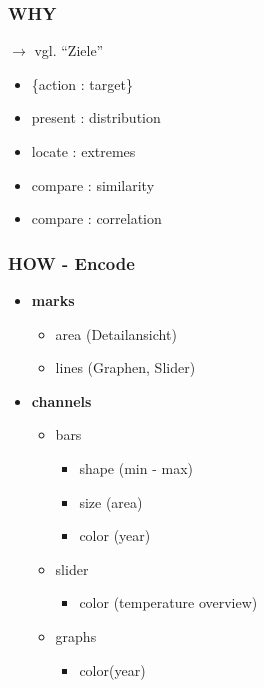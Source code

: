 \documentclass{beamer}
\begin{document}
  \begin{frame}
  \frametitle{WHY}
  $\rightarrow$ vgl. ``Ziele''
    \begin{itemize}
      \item \{action : target\}
      \item present : distribution
      \item locate : extremes
      \item compare : similarity
      \item compare : correlation
    \end{itemize}
  \end{frame}
  
  \begin{frame}
  \frametitle{HOW - Encode}
    \begin{itemize}
      \item \textbf{marks}
	\begin{itemize}
	  \item area (Detailansicht)
	  \item lines (Graphen, Slider)
	\end{itemize}
      \item \textbf{channels}
	\begin{itemize}
	  \item bars
	  \begin{itemize}
	   \item shape (min - max)
	   \item size (area)
	   \item color (year)
	  \end{itemize}
	  \item slider
	  \begin{itemize}
	   \item color (temperature overview)
	  \end{itemize}
	  \item graphs
	  \begin{itemize}
	   \item color(year)
	  \end{itemize}
	\end{itemize}
    \end{itemize}
  \end{frame}
  
\end{document}
